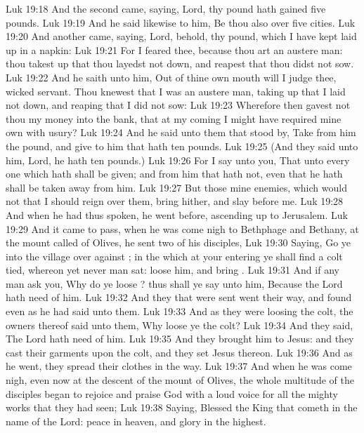 \vs Luk 19:18 And the second came, saying, Lord, thy pound hath gained five pounds.
\vs Luk 19:19 And he said likewise to him, Be thou also over five cities.
\vs Luk 19:20 And another came, saying, Lord, behold,  thy pound, which I have kept laid up in a napkin:
\vs Luk 19:21 For I feared thee, because thou art an austere man: thou takest up that thou layedst not down, and reapest that thou didst not sow.
\vs Luk 19:22 And he saith unto him, Out of thine own mouth will I judge thee,  wicked servant. Thou knewest that I was an austere man, taking up that I laid not down, and reaping that I did not sow:
\vs Luk 19:23 Wherefore then gavest not thou my money into the bank, that at my coming I might have required mine own with usury?
\vs Luk 19:24 And he said unto them that stood by, Take from him the pound, and give  to him that hath ten pounds.
\vs Luk 19:25 (And they said unto him, Lord, he hath ten pounds.)
\vs Luk 19:26 For I say unto you, That unto every one which hath shall be given; and from him that hath not, even that he hath shall be taken away from him.
\vs Luk 19:27 But those mine enemies, which would not that I should reign over them, bring hither, and slay  before me.
\vs Luk 19:28 And when he had thus spoken, he went before, ascending up to Jerusalem.
\vs Luk 19:29 And it came to pass, when he was come nigh to Bethphage and Bethany, at the mount called  of Olives, he sent two of his disciples,
\vs Luk 19:30 Saying, Go ye into the village over against ; in the which at your entering ye shall find a colt tied, whereon yet never man sat: loose him, and bring .
\vs Luk 19:31 And if any man ask you, Why do ye loose ? thus shall ye say unto him, Because the Lord hath need of him.
\vs Luk 19:32 And they that were sent went their way, and found even as he had said unto them.
\vs Luk 19:33 And as they were loosing the colt, the owners thereof said unto them, Why loose ye the colt?
\vs Luk 19:34 And they said, The Lord hath need of him.
\vs Luk 19:35 And they brought him to Jesus: and they cast their garments upon the colt, and they set Jesus thereon.
\vs Luk 19:36 And as he went, they spread their clothes in the way.
\vs Luk 19:37 And when he was come nigh, even now at the descent of the mount of Olives, the whole multitude of the disciples began to rejoice and praise God with a loud voice for all the mighty works that they had seen;
\vs Luk 19:38 Saying, Blessed  the King that cometh in the name of the Lord: peace in heaven, and glory in the highest.
